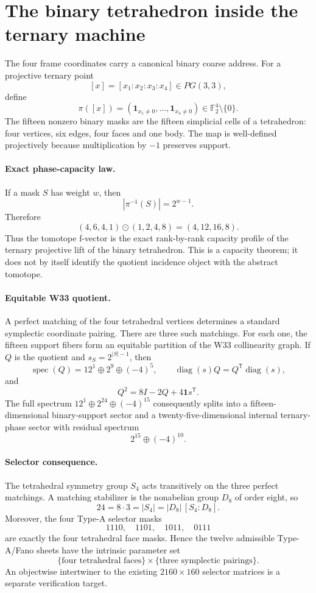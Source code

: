 \section{The binary tetrahedron inside the ternary machine}
\label{sec:pg32-support-lift}

\noindent
The four frame coordinates carry a canonical binary coarse address.  For a
projective ternary point
\[
 [x]=[x_1:x_2:x_3:x_4]\in PG(3,3),
\]
define
\[
 \pi([x])=(\mathbf 1_{x_1\ne0},\ldots,\mathbf 1_{x_4\ne0})
 \in\mathbb F_2^4\setminus\{0\}.
\]
The fifteen nonzero binary masks are the fifteen simplicial cells of a
tetrahedron: four vertices, six edges, four faces and one body.  The map is
well-defined projectively because multiplication by $-1$ preserves support.

\paragraph{Exact phase-capacity law.}
If a mask $S$ has weight $w$, then
\[
 \boxed{|\pi^{-1}(S)|=2^{w-1}.}
\]
Therefore
\[
 (4,6,4,1)\odot(1,2,4,8)
 =
 \boxed{(4,12,16,8)}.
\]
Thus the tomotope f-vector is the exact rank-by-rank capacity profile of the
ternary projective lift of the binary tetrahedron.  This is a capacity theorem;
it does not by itself identify the quotient incidence object with the abstract
tomotope.

\paragraph{Equitable W33 quotient.}
A perfect matching of the four tetrahedral vertices determines a standard
symplectic coordinate pairing.  There are three such matchings.  For each one,
the fifteen support fibers form an equitable partition of the W33
collinearity graph.  If $Q$ is the quotient and
$s_S=2^{|S|-1}$, then
\[
 \operatorname{spec}(Q)=12^1\oplus2^9\oplus(-4)^5,
 \qquad
 \operatorname{diag}(s)Q=Q^{\mathsf T}\operatorname{diag}(s),
\]
and
\[
 \boxed{Q^2=8I-2Q+4\mathbf1s^{\mathsf T}.}
\]
The full spectrum
$12^1\oplus2^{24}\oplus(-4)^{15}$ consequently splits into a
fifteen-dimensional binary-support sector and a twenty-five-dimensional
internal ternary-phase sector with residual spectrum
\[
 \boxed{2^{15}\oplus(-4)^{10}.}
\]

\paragraph{Selector consequence.}
The tetrahedral symmetry group $S_4$ acts transitively on the three perfect
matchings.  A matching stabilizer is the nonabelian group $D_8$ of order
eight, so
\[
 \boxed{24=8\cdot3=|S_4|=|D_8|\,[S_4:D_8].}
\]
Moreover, the four Type-A selector masks
\[
 1110,\quad1101,\quad1011,\quad0111
\]
are exactly the four tetrahedral face masks.  Hence the twelve admissible
Type-A/Fano sheets have the intrinsic parameter set
\[
 \{\text{four tetrahedral faces}\}
 \times
 \{\text{three symplectic pairings}\}.
\]
An objectwise intertwiner to the existing $2160\times160$ selector matrices is
a separate verification target.

